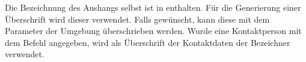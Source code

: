 \begin{DeclareEntity}{}
\begin{Declaration}
\begin{Declaration}
Die Bezeichnung des Aushangs selbst ist in  enthalten. Für 
die Generierung einer Überschrift wird dieser verwendet. Falls gewünscht, kann 
diese mit dem Parameter  der Umgebung 
 überschrieben werden. Wurde eine Kontaktperson mit dem 
Befehl  angegeben, wird als Überschrift der Kontaktdaten 
der Bezeichner  verwendet.
\end{Declaration}
\end{Declaration}
%
\end{DeclareEntity}
